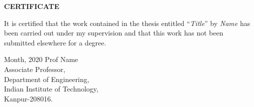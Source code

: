 \newpage
\thispagestyle{empty}
\begin{center}
{\bf CERTIFICATE}
\end{center}

\par 
\noindent
It is  certified  that the work contained in the thesis entitled ``{\em Title}'' by {\em Name}  has been carried out under my supervision and that this work has not been submitted elsewhere for a degree.

\vspace*{1.5cm}
Month, 2020
\hspace*{5.5cm}Prof Name\\
\hspace*{8cm}Associate Professor,\\
\hspace*{8cm}Department of Engineering,\\
\hspace*{8cm}Indian Institute of Technology,\\
\hspace*{8cm}Kanpur-208016.
\newline

